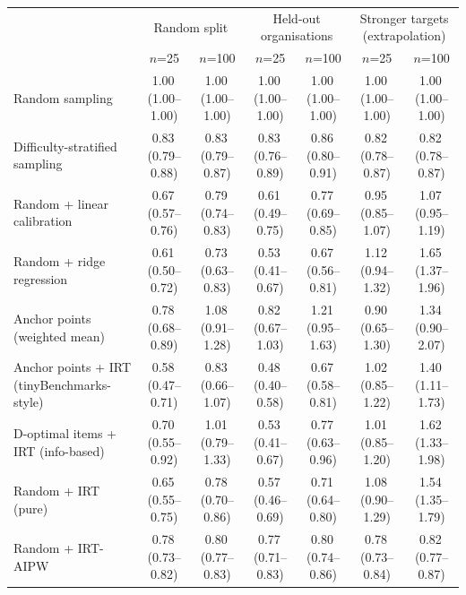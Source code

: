 \begin{tabular}{lcccccc}
\toprule
 & \multicolumn{2}{c}{Random split} & \multicolumn{2}{c}{Held-out organisations} & \multicolumn{2}{c}{Stronger targets (extrapolation)} \\
 & $n$=25 & $n$=100 & $n$=25 & $n$=100 & $n$=25 & $n$=100 \\
\midrule
Random sampling & 1.00\,\scriptsize(1.00--1.00) & 1.00\,\scriptsize(1.00--1.00) & 1.00\,\scriptsize(1.00--1.00) & 1.00\,\scriptsize(1.00--1.00) & 1.00\,\scriptsize(1.00--1.00) & 1.00\,\scriptsize(1.00--1.00) \\
Difficulty-stratified sampling & 0.83\,\scriptsize(0.79--0.88) & 0.83\,\scriptsize(0.79--0.87) & 0.83\,\scriptsize(0.76--0.89) & 0.86\,\scriptsize(0.80--0.91) & 0.82\,\scriptsize(0.78--0.87) & 0.82\,\scriptsize(0.78--0.87) \\
Random + linear calibration & 0.67\,\scriptsize(0.57--0.76) & 0.79\,\scriptsize(0.74--0.83) & 0.61\,\scriptsize(0.49--0.75) & 0.77\,\scriptsize(0.69--0.85) & 0.95\,\scriptsize(0.85--1.07) & 1.07\,\scriptsize(0.95--1.19) \\
Random + ridge regression & 0.61\,\scriptsize(0.50--0.72) & 0.73\,\scriptsize(0.63--0.83) & 0.53\,\scriptsize(0.41--0.67) & 0.67\,\scriptsize(0.56--0.81) & 1.12\,\scriptsize(0.94--1.32) & 1.65\,\scriptsize(1.37--1.96) \\
Anchor points (weighted mean) & 0.78\,\scriptsize(0.68--0.89) & 1.08\,\scriptsize(0.91--1.28) & 0.82\,\scriptsize(0.67--1.03) & 1.21\,\scriptsize(0.95--1.63) & 0.90\,\scriptsize(0.65--1.30) & 1.34\,\scriptsize(0.90--2.07) \\
Anchor points + IRT (tinyBenchmarks-style) & 0.58\,\scriptsize(0.47--0.71) & 0.83\,\scriptsize(0.66--1.07) & 0.48\,\scriptsize(0.40--0.58) & 0.67\,\scriptsize(0.58--0.81) & 1.02\,\scriptsize(0.85--1.22) & 1.40\,\scriptsize(1.11--1.73) \\
D-optimal items + IRT (info-based) & 0.70\,\scriptsize(0.55--0.92) & 1.01\,\scriptsize(0.79--1.33) & 0.53\,\scriptsize(0.41--0.67) & 0.77\,\scriptsize(0.63--0.96) & 1.01\,\scriptsize(0.85--1.20) & 1.62\,\scriptsize(1.33--1.98) \\
Random + IRT (pure) & 0.65\,\scriptsize(0.55--0.75) & 0.78\,\scriptsize(0.70--0.86) & 0.57\,\scriptsize(0.46--0.69) & 0.71\,\scriptsize(0.64--0.80) & 1.08\,\scriptsize(0.90--1.29) & 1.54\,\scriptsize(1.35--1.79) \\
Random + IRT-AIPW & 0.78\,\scriptsize(0.73--0.82) & 0.80\,\scriptsize(0.77--0.83) & 0.77\,\scriptsize(0.71--0.83) & 0.80\,\scriptsize(0.74--0.86) & 0.78\,\scriptsize(0.73--0.84) & 0.82\,\scriptsize(0.77--0.87) \\

\end{tabular}
